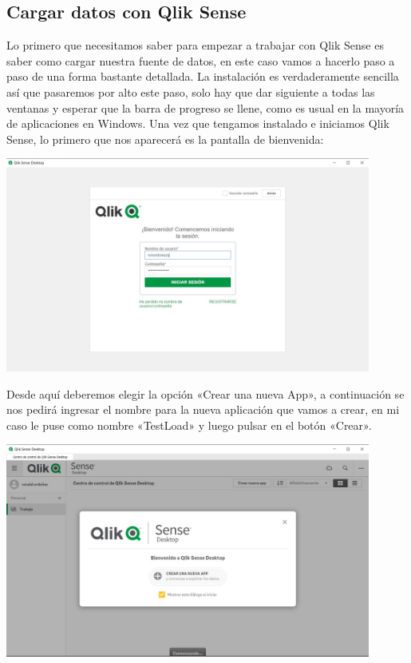 \subsection{Cargar datos con Qlik Sense}

Lo primero que necesitamos saber para empezar a trabajar con Qlik Sense es saber como cargar nuestra fuente de datos, en este caso vamos a hacerlo paso a paso de una forma bastante detallada. La instalación es verdaderamente sencilla así que pasaremos por alto este paso, solo hay que dar siguiente a todas las ventanas y esperar que la barra de progreso se llene, como es usual en la mayoría de aplicaciones en Windows.
Una vez que tengamos instalado e iniciamos Qlik Sense, lo primero que nos aparecerá es la pantalla de bienvenida:


\begin{center}
	\includegraphics[width=12cm]{./Imagenes/img6} 
\end{center}

Desde aquí deberemos elegir la opción «Crear una nueva App», a continuación se nos pedirá ingresar el nombre para la nueva aplicación que vamos a crear, en mi caso le puse como nombre «TestLoad» y luego pulsar en el botón «Crear».

\begin{center}
	\includegraphics[width=12cm]{./Imagenes/img7} 
\end{center}

